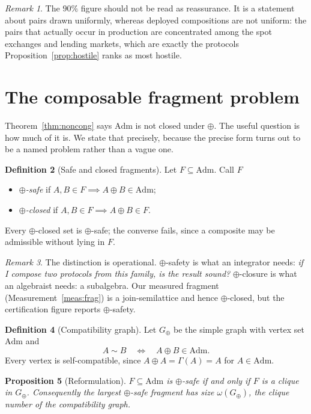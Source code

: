 \documentclass[11pt]{article}
\theoremstyle{definition}
\newtheorem{definition}{Definition}[section]
\theoremstyle{plain}
\newtheorem{proposition}[definition]{Proposition}
\theoremstyle{remark}
\newtheorem{remark}[definition]{Remark}
\newcommand{\Adm}{\mathrm{Adm}}
\begin{document}
\begin{remark}
The $90\%$ figure should not be read as reassurance. It is a statement about
pairs drawn uniformly, whereas deployed compositions are not uniform: the pairs
that actually occur in production are concentrated among the spot exchanges and
lending markets, which are exactly the protocols
Proposition~\ref{prop:hostile} ranks as most hostile.
\end{remark}

\section{The composable fragment problem}\label{sec:cfp}

Theorem~\ref{thm:noncong} says $\Adm$ is not closed under $\oplus$. The useful
question is how much of it is. We state that precisely, because the precise form
turns out to be a named problem rather than a vague one.

\begin{definition}[Safe and closed fragments]
Let $F \subseteq \Adm$. Call $F$
\begin{itemize}
  \item \emph{$\oplus$-safe} if $A, B \in F \implies A \oplus B \in \Adm$;
  \item \emph{$\oplus$-closed} if $A, B \in F \implies A \oplus B \in F$.
\end{itemize}
Every $\oplus$-closed set is $\oplus$-safe; the converse fails, since a composite
may be admissible without lying in $F$.
\end{definition}

\begin{remark}
The distinction is operational. $\oplus$-safety is what an integrator needs:
\emph{if I compose two protocols from this family, is the result sound?}
$\oplus$-closure is what an algebraist needs: a subalgebra. Our measured fragment
(Measurement~\ref{meas:frag}) is a join-semilattice and hence $\oplus$-closed,
but the certification figure reports $\oplus$-safety.
\end{remark}

\begin{definition}[Compatibility graph]
Let $G_\oplus$ be the simple graph with vertex set $\Adm$ and
\[
  A \sim B \quad\Longleftrightarrow\quad A \oplus B \in \Adm .
\]
Every vertex is self-compatible, since $A \oplus A = \Gamma(A) = A$ for
$A \in \Adm$.
\end{definition}

\begin{proposition}[Reformulation]\label{prop:clique}
$F \subseteq \Adm$ is $\oplus$-safe if and only if $F$ is a clique in
$G_\oplus$. Consequently the largest $\oplus$-safe fragment has size
$\omega(G_\oplus)$, the clique number of the compatibility graph.
\end{proposition}
\end{document}
